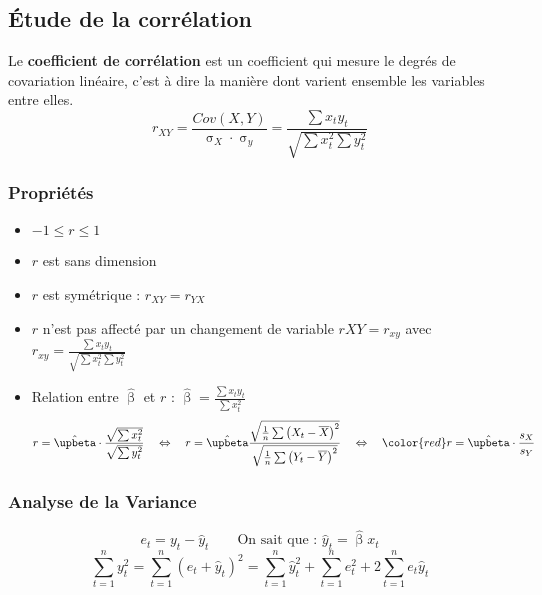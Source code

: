 \documentclass{article}
\newcommand{\hbeta}{\hat{\upbeta}}
\newcommand{\sumt}{\sum\limits_{t=1}^n}
\newcommand{\xb}{\overline{X}}
\newcommand{\yb}{\overline{Y}}
\begin{document}
\subsection{Étude de la corrélation}
 Le \textbf{coefficient de corrélation} est un coefficient qui mesure le degrés de covariation linéaire, c'est à dire la manière dont varient ensemble les variables entre elles.
 \[r_{XY} = \frac{Cov(X,Y)}{\upsigma_X \cdot \upsigma_y} = \frac{\sum x_t y_t}{\sqrt{\sum x_t^2 \sum y_t^2}}\]
 
 \subsubsection{Propriétés}
 \begin{itemize}
 	\item $-1 \leq r \leq 1$
 	\item $r$ est sans dimension
 	\item $r$ est symétrique : $r_{XY} = r_{YX}$
 	\item $r$ n'est pas affecté par un changement de variable $r{XY} = r_{xy}$ \quad avec $r_{xy} =  \frac{\sum x_t y_t}{\sqrt{\sum x_t^2 \sum y_t^2}}$
 	\item Relation entre $\hbeta$ et $r$ : \quad $\hbeta = \frac{\sum x_t y_t}{\sum x_t^2}$
 	 \[r = \hbeta \cdot \frac{\sqrt{\sum x_t^2}}{\sqrt{\sum y_t^2}} \quad \Leftrightarrow \quad r = \hbeta \frac{\sqrt{\frac{1}{n} \sum \left(X_t - \xb \right)^2}}{\sqrt{\frac{1}{n}\sum \left(Y_t - \yb\right)^2}} \quad \Leftrightarrow \quad {\color{red}r = \hbeta \cdot \frac{s_X}{s_Y}} \]
 \end{itemize}

 \subsubsection{Analyse de la Variance}
 \[e_t = y_t - \hat{y}_t \qquad \textrm{On sait que : } \hat{y}_t = \hbeta x_t\]
 \[\sumt y_t^2 = \sumt \left(e_t + \hat{y}_t\right)^2 = \sumt \hat{y}_t^2 + \sumt e_t^2 + 2 \sumt e_t \hat{y}_t\]
 
\end{document}
